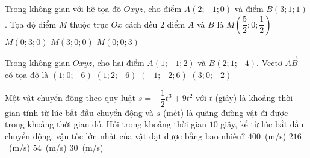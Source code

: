 \documentclass[12pt,a4paper]{article}
\begin{document}
\begin{ex}%
	Trong không gian với hệ tọa độ $Oxyz$, cho điểm $A(2;-1; 0)$ và điểm $B(3; 1; 1)$. Tọa độ điểm $M$ thuộc trục $Ox$ cách đều $2$ điểm $A$ và $B$ là
	\choice
{$M\left(\dfrac{5}{2}; 0; \dfrac{1}{2}\right)$}
{$M(0; 3; 0)$}
{\True $M(3; 0; 0)$}
{$M(0; 0; 3)$}
\end{ex}
\begin{ex}%
	Trong không gian $Oxyz$, cho hai điểm $A(1;-1; 2)$ và $B(2; 1;-4)$. Vectơ $\overrightarrow{AB}$ có tọa độ là
	\choice
{$(1; 0;-6)$}
{\True $(1; 2;-6)$}
{$(-1;-2; 6)$}
{$(3; 0;-2)$}
\end{ex}
\begin{ex}%
	Một vật chuyển động theo quy luật $s=-\dfrac{1}{2} t^3+9t^2$ với $t$ (giây) là khoảng thời gian tính từ lúc bắt đầu chuyển động và $s$ (mét) là quãng đường vật đi được trong khoảng thời gian đó. Hỏi trong khoảng thời gian $10$ giây, kể từ lúc bắt đầu chuyển động, vận tốc lớn nhất của vật đạt được bằng bao nhiêu?
	\choice
{$400$~(m/s)}
{$216$~(m/s)}
{\True $54$~(m/s)}
{$30$~(m/s)}
\end{ex}
\end{document}
